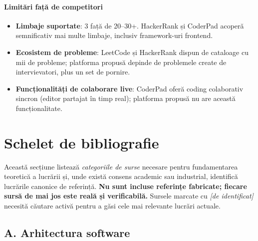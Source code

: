 \paragraph{Limitări față de competitori}
\begin{itemize}
  \item \textbf{Limbaje suportate}: 3 față de 20--30+. HackerRank și
        CoderPad acoperă semnificativ mai multe limbaje, inclusiv
        framework-uri frontend.
  \item \textbf{Ecosistem de probleme}: LeetCode și HackerRank dispun
        de cataloage cu mii de probleme; platforma propusă depinde de
        problemele create de intervievatori, plus un set de pornire.
  \item \textbf{Funcționalități de colaborare live}: CoderPad oferă
        coding colaborativ sincron (editor partajat în timp real);
        platforma propusă nu are această funcționalitate.
\end{itemize}


\section{Schelet de bibliografie}
\label{sec:bibliografie_schelet}

Această secțiune listează \emph{categoriile de surse} necesare pentru
fundamentarea teoretică a lucrării și, unde există consens academic sau
industrial, identifică lucrările canonice de referință.
\textbf{Nu sunt incluse referințe fabricate; fiecare sursă de mai jos
este reală și verificabilă.}
Sursele marcate cu \emph{[de identificat]} necesită căutare activă
pentru a găsi cele mai relevante lucrări actuale.

\subsection*{A. Arhitectura software}

